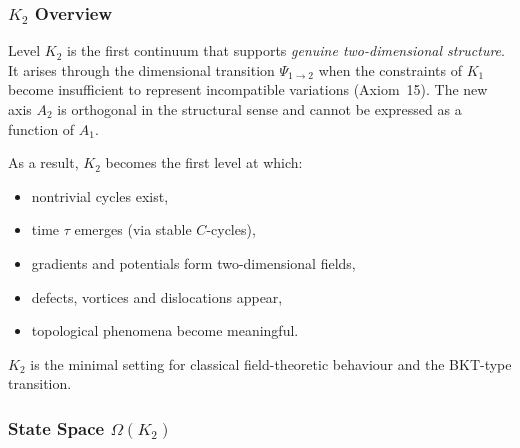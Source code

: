 

\subsubsection{\texorpdfstring{$K_2$}{K_2} Overview}
\label{sec:k2-overview}

Level $K_2$ is the first continuum that supports \emph{genuine
two-dimensional structure}. It arises through the dimensional transition
$\Psi_{1\to2}$ when the constraints of $K_1$ become insufficient to
represent incompatible variations (Axiom~15). The new axis $A_2$ is
orthogonal in the structural sense and cannot be expressed as a function
of $A_1$.

As a result, $K_2$ becomes the first level at which:
\begin{itemize}
    \item nontrivial cycles exist,
    \item time $\tau$ emerges (via stable $C$-cycles),
    \item gradients and potentials form two-dimensional fields,
    \item defects, vortices and dislocations appear,
    \item topological phenomena become meaningful.
\end{itemize}

$K_2$ is the minimal setting for classical field-theoretic behaviour and
the BKT-type transition.

\subsubsection{State Space \texorpdfstring{$\Omega(K_2)$}{\Omega(K_2)}}

